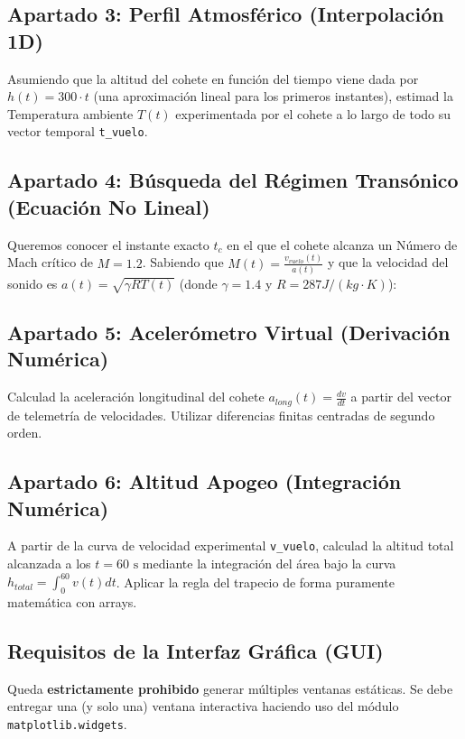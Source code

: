 	
	\subsection*{Apartado 3: Perfil Atmosférico (Interpolación 1D)}
	Asumiendo que la altitud del cohete en función del tiempo 
	viene dada por $h(t) = 300 \cdot t$ 
	(una aproximación lineal para los primeros instantes), 
	estimad la Temperatura ambiente $T(t)$ experimentada 
	por el cohete a lo largo de todo su vector temporal 
	\texttt{t\_vuelo}.
	
	
	\subsection*{Apartado 4: Búsqueda del Régimen Transónico (Ecuación No Lineal)}
	Queremos conocer el instante exacto $t_c$ en el que el cohete alcanza un Número de Mach crítico de $M = 1.2$. Sabiendo que $M(t) = \frac{v_{vuelo}(t)}{a(t)}$ y que la velocidad del sonido es 
	$a(t) = \sqrt{\gamma R T(t)}$ (donde $\gamma=1.4$ y $R=287  J/(kg \cdot K)$):
	
	\subsection*{Apartado 5: Acelerómetro Virtual (Derivación Numérica)}
	Calculad la aceleración longitudinal del cohete $a_{long}(t) = \frac{dv}{dt}$ a partir del vector de telemetría de velocidades.
	 Utilizar diferencias finitas centradas de segundo orden. 
	
	\subsection*{Apartado 6: Altitud Apogeo (Integración Numérica)}
	A partir de la curva de velocidad experimental \texttt{v\_vuelo}, calculad la altitud total alcanzada a los $t=60\text{ s}$ mediante la integración del área bajo la curva $h_{total} = \int_{0}^{60} v(t) dt$.
	 Aplicar la regla del trapecio de forma puramente 
	 matemática con arrays.
	
	\subsection*{Requisitos de la Interfaz Gráfica (GUI)}
	
	Queda \textbf{estrictamente prohibido} generar múltiples ventanas estáticas. Se debe entregar una (y solo una) ventana interactiva haciendo uso del módulo \texttt{matplotlib.widgets}.
	
